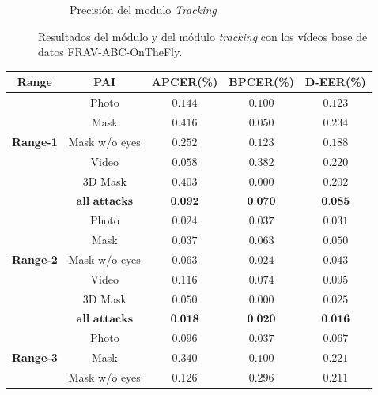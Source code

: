 \begin{figure}[t!]
\begin{subfigure}{.45\textwidth}
        \caption{Precisión del modulo \emph{Tracking}}
        \label{fig:result_matrix_real}
    \end{subfigure}
    \caption{Resultados del módulo  y del módulo \textit{tracking} con los vídeos base de datos \Gls{FRAV-ABC-OnTheFly}.}
    \label{fig:APCER-BPCER-RESULT-ABC-OnTheFly}
\end{figure}


\begin{table}[t!]
\centering
\begin{tabular}{|c|c|c|c|c|}
\hline
\textbf{Range} & \textbf{PAI} & \textbf{APCER(\%)} & \textbf{BPCER(\%)} & \textbf{D-EER(\%)} \\ \hline 
\multirow{5}{*}{\textbf{Range-1}} &Photo& $0.144$ & $0.100$ & $0.123$ \\ \cline{2-5} 
                                  &Mask& $0.416$ & $0.050$ & $0.234$ \\ \cline{2-5} 
                                  &Mask w/o eyes& $0.252$ & $0.123$ & $0.188$ \\ \cline{2-5} 
                                  &Video& $0.058$ & $0.382$ & $0.220$ \\ \cline{2-5} 
                                  &$3$D Mask& $0.403$ & $0.000$ & $0.202$ \\ \cline{2-5}
                                  &$\textbf{all attacks}$&$\textbf{0.092}$ &$\textbf{0.070}$ &$\textbf{0.085}$ \\ \hline
\multirow{5}{*}{\textbf{Range-2}} &Photo& $0.024$ & $0.037$ & $0.031$ \\ \cline{2-5} 
                                  &Mask& $0.037$ & $0.063$ & $0.050$ \\ \cline{2-5} 
                                  &Mask w/o eyes & $0.063$ & $0.024$ & $0.043$ \\ \cline{2-5} 
                                  &Video& $0.116$ & $0.074$ & $0.095$ \\ \cline{2-5} 
                                  &$3$D Mask& $0.050$ & $0.000$ & $0.025$ \\ \cline{2-5}
                                  &$\textbf{all attacks}$ & $\textbf{0.018}$ & $\textbf{0.020}$ & $\textbf{0.016}$ \\ \hline
\multirow{5}{*}{\textbf{Range-3}} &Photo & $0.096$ & $0.037$ & $0.067$ \\ \cline{2-5} 
                                  &Mask& $0.340$ & $0.100$ & $0.221$ \\ \cline{2-5} 
                                  &Mask w/o eyes& $0.126$ & $0.296$ & $0.211$ \\ \cline{2-5} 

\end{tabular}
\end{table}

